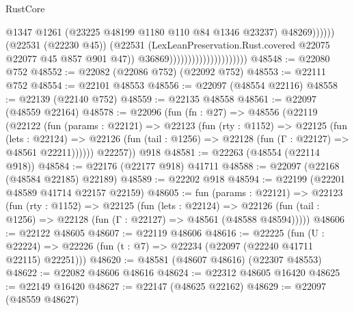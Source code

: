 \begin{lexlean}{RustCore}
\begin{coremodule}
                                                          @1347
                                                          @1261
                                                          (@23225
                                                            @48199
                                                            @1180
                                                            @110
                                                            @84
                                                            @1346
                                                            @23237)
                                                          @48269))))))
                                              (@22531 (@22230 @45))
                                              (@22531
                                                (LexLeanPreservation.Rust.covered
                                                  @22075
                                                  @22077
                                                  @45
                                                  @857
                                                  @901
                                                  @47))
                                              @36869)))))))))))))))))))))
@48548 := @22080 @752
@48552 := @22082 (@22086 @752) (@22092 @752)
@48553 := @22111 @752
@48554 := @22101 @48553
@48556 := @22097 (@48554 @22116)
@48558 := @22139 (@22140 @752)
@48559 := @22135 @48558
@48561 := @22097 (@48559 @22164)
@48578 := @22096
    (fun (fn : @27) =>
    @48556
      (@22119
        (@22122
          (fun (params : @22121) =>
          @22123
            (fun (rty : @1152) =>
            @22125
              (fun (lets : @22124) =>
              @22126 (fun (tail : @1256) => @22128 (fun (Γ : @22127) => @48561 @22211))))))
        @22257))
    @918
@48581 := @22263 (@48554 (@22114 @918))
@48584 := @22176 (@22177 @918) @41711
@48588 := @22097 (@22168 (@48584 @22185) @22189)
@48589 := @22202 @918
@48594 := @22199 (@22201 @48589 @41714 @22157 @22159)
@48605 := fun (params : @22121) =>
  @22123
    (fun (rty : @1152) =>
    @22125
      (fun (lets : @22124) =>
      @22126 (fun (tail : @1256) => @22128 (fun (Γ : @22127) => @48561 (@48588 @48594)))))
@48606 := @22122 @48605
@48607 := @22119 @48606
@48616 := @22225
    (fun (U : @22224) => @22226 (fun (t : @7) => @22234 (@22097 (@22240 @41711 @22115) @22251)))
@48620 := @48581 (@48607 @48616) (@22307 @48553)
@48622 := @22082 @48606 @48616
@48624 := @22312 @48605 @16420
@48625 := @22149 @16420
@48627 := @22147 (@48625 @22162)
@48629 := @22097 (@48559 @48627)

\end{coremodule}
\end{lexlean}
